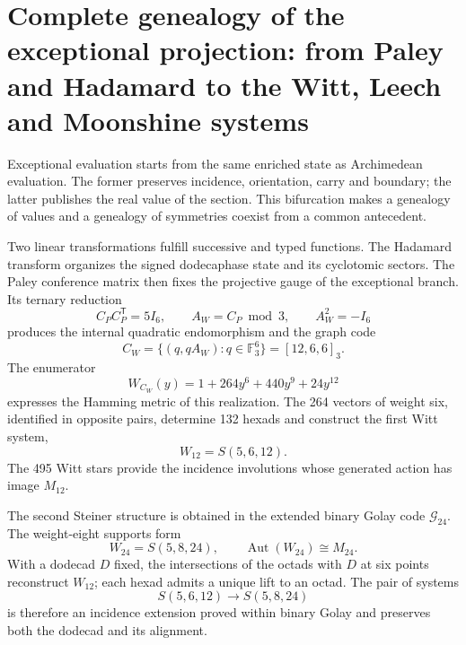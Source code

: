 \section{Complete genealogy of the exceptional projection: from Paley and
Hadamard to the Witt, Leech and Moonshine systems}
\label{sec:genealogia-excepcional-completa-autonoma}

Exceptional evaluation starts from the same enriched state as
Archimedean evaluation. The former preserves incidence, orientation,
carry and boundary; the latter publishes the real value of the section. This
bifurcation makes a genealogy of values and a genealogy of symmetries
coexist from a common antecedent.

Two linear transformations fulfill successive and typed functions. The
Hadamard transform organizes the signed dodecaphase state and its
cyclotomic sectors. The Paley conference matrix then fixes the
projective gauge of the exceptional branch. Its ternary reduction
\[
 C_P C_P^{\mathsf T}=5I_6,
 \qquad
 A_W=C_P\bmod3,
 \qquad
 A_W^2=-I_6
\]
produces the internal quadratic endomorphism and the graph code
\[
 C_W=\{(q,qA_W):q\in\mathbb F_3^6\}
      =[12,6,6]_3.
\]
The enumerator
\[
 W_{C_W}(y)=1+264y^6+440y^9+24y^{12}
\]
expresses the Hamming metric of this realization. The 264 vectors of weight
six, identified in opposite pairs, determine 132 hexads and construct
the first Witt system,
\[
 W_{12}=S(5,6,12).
\]
The 495 Witt stars provide the incidence involutions whose
generated action has image \(M_{12}\).

The second Steiner structure is obtained in the extended binary
Golay code \(\mathcal G_{24}\). The weight-eight supports form
\[
 W_{24}=S(5,8,24),
 \qquad \operatorname{Aut}(W_{24})\cong M_{24}.
\]
With a dodecad \(D\) fixed, the intersections of the octads with \(D\) at
six points reconstruct \(W_{12}\); each hexad admits a unique lift
to an octad. The pair of systems
\[
 S(5,6,12)\longrightarrow S(5,8,24)
\]
is therefore an incidence extension proved within binary
Golay and preserves both the dodecad and its alignment.

